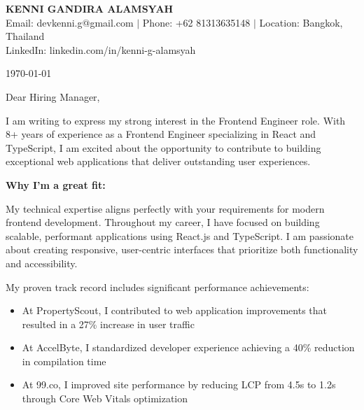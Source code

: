\documentclass[12pt]{article}
\begin{document}
\begin{center}
    {\LARGE\textbf{KENNI GANDIRA ALAMSYAH}}\\[0.3cm]
    Email: devkenni.g@gmail.com $|$ Phone: +62 81313635148 $|$ Location: Bangkok, Thailand\\
    LinkedIn: linkedin.com/in/kenni-g-alamsyah
\end{center}

\vspace{1cm}

\today

\vspace{0.5cm}

Dear Hiring Manager,

\vspace{0.5cm}

I am writing to express my strong interest in the Frontend Engineer role. With 8+ years of experience as a Frontend Engineer specializing in React and TypeScript, I am excited about the opportunity to contribute to building exceptional web applications that deliver outstanding user experiences.

\vspace{0.3cm}

\textbf{Why I'm a great fit:}

\vspace{0.3cm}

My technical expertise aligns perfectly with your requirements for modern frontend development. Throughout my career, I have focused on building scalable, performant applications using React.js and TypeScript. I am passionate about creating responsive, user-centric interfaces that prioritize both functionality and accessibility.

\vspace{0.3cm}

My proven track record includes significant performance achievements:
\begin{itemize}
    \item At PropertyScout, I contributed to web application improvements that resulted in a 27\% increase in user traffic
    \item At AccelByte, I standardized developer experience achieving a 40\% reduction in compilation time
    \item At 99.co, I improved site performance by reducing LCP from 4.5s to 1.2s through Core Web Vitals optimization
\end{itemize}
\end{document}
